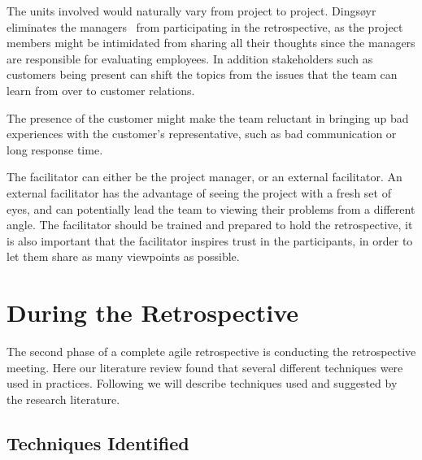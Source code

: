\documentclass[12pt]{article}
\begin{document}
The units involved would naturally vary from project to project. Dingsøyr eliminates the managers~\cite{Dingsoyr2005} from participating in the retrospective, as the project members might be intimidated from sharing all their thoughts since the managers are responsible for evaluating employees. In addition stakeholders such as customers being present can shift the topics from the issues that the team can learn from over to customer relations. 

The presence of the customer might make the team reluctant in bringing up bad experiences with the customer's representative, such as bad communication or long response time. 

The facilitator can either be the project manager, or an external facilitator. An external facilitator has the advantage of seeing the project with a fresh set of eyes, and can potentially lead the team to viewing their problems from a different angle. The facilitator should be trained and prepared to hold the retrospective, it is also important that the facilitator inspires trust in the participants, in order to let them share as many viewpoints as possible.

\section{During the Retrospective}
The second phase of a complete agile retrospective is conducting the retrospective meeting. Here our literature review found that several different techniques were used in practices. Following we will describe techniques used and suggested by the research literature.

\subsection{Techniques Identified} \label{subsec:technqiues-identified}
\end{document}
